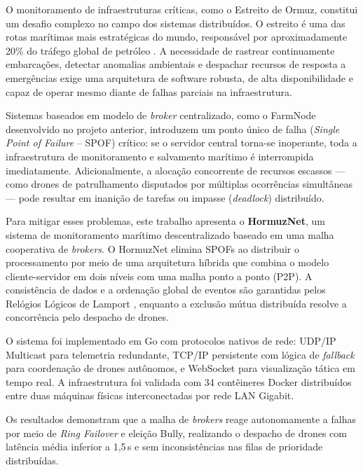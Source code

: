 O monitoramento de infraestruturas críticas, como o Estreito de Ormuz, constitui um desafio complexo no campo dos sistemas distribuídos. O estreito é uma das rotas marítimas mais estratégicas do mundo, responsável por aproximadamente 20\% do tráfego global de petróleo \cite{tanenbaum2021redes}. A necessidade de rastrear continuamente embarcações, detectar anomalias ambientais e despachar recursos de resposta a emergências exige uma arquitetura de software robusta, de alta disponibilidade e capaz de operar mesmo diante de falhas parciais na infraestrutura.

Sistemas baseados em modelo de \textit{broker} centralizado, como o FarmNode desenvolvido no projeto anterior, introduzem um ponto único de falha (\textit{Single Point of Failure} -- SPOF) crítico: se o servidor central torna-se inoperante, toda a infraestrutura de monitoramento e salvamento marítimo é interrompida imediatamente. Adicionalmente, a alocação concorrente de recursos escassos --- como drones de patrulhamento disputados por múltiplas ocorrências simultâneas --- pode resultar em inanição de tarefas ou impasse (\textit{deadlock}) distribuído.

Para mitigar esses problemas, este trabalho apresenta o \textbf{HormuzNet}, um sistema de monitoramento marítimo descentralizado baseado em uma malha cooperativa de \textit{brokers}. O HormuzNet elimina SPOFs ao distribuir o processamento por meio de uma arquitetura híbrida que combina o modelo cliente-servidor em dois níveis com uma malha ponto a ponto (P2P). A consistência de dados e a ordenação global de eventos são garantidas pelos Relógios Lógicos de Lamport \cite{lamport1978time}, enquanto a exclusão mútua distribuída resolve a concorrência pelo despacho de drones.

O sistema foi implementado em Go com protocolos nativos de rede: UDP/IP Multicast para telemetria redundante, TCP/IP persistente com lógica de \textit{fallback} para coordenação de drones autônomos, e WebSocket para visualização tática em tempo real. A infraestrutura foi validada com 34 contêineres Docker distribuídos entre duas máquinas físicas interconectadas por rede LAN Gigabit.

Os resultados demonstram que a malha de \textit{brokers} reage autonomamente a falhas por meio de \textit{Ring Failover} e eleição Bully, realizando o despacho de drones com latência média inferior a 1,5\,s e sem inconsistências nas filas de prioridade distribuídas.
